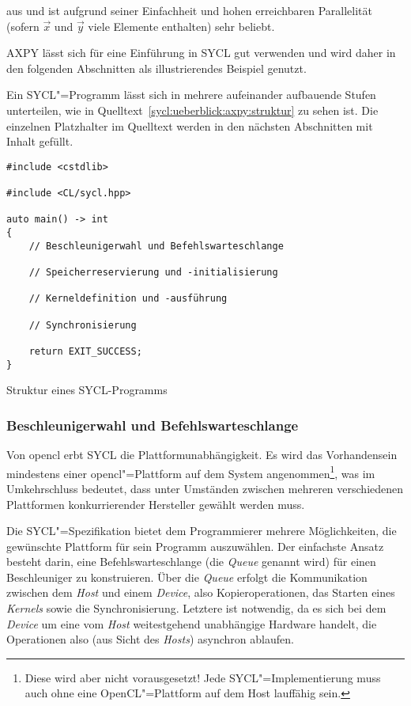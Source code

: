 aus und ist aufgrund seiner Einfachheit und hohen erreichbaren Parallelität
(sofern $\vec{x}$ und $\vec{y}$ viele Elemente enthalten) sehr beliebt.

AXPY lässt sich für eine Einführung in SYCL gut verwenden und wird daher in den
folgenden Abschnitten als illustrierendes Beispiel genutzt.

Ein SYCL"=Programm lässt sich in mehrere aufeinander aufbauende Stufen
unterteilen, wie in Quelltext~\ref{sycl:ueberblick:axpy:struktur} zu sehen ist.
Die einzelnen Platzhalter im Quelltext werden in den nächsten Abschnitten mit
Inhalt gefüllt.

\begin{code}
    \begin{verbatim}
#include <cstdlib>

#include <CL/sycl.hpp>

auto main() -> int
{
    // Beschleunigerwahl und Befehlswarteschlange

    // Speicherreservierung und -initialisierung

    // Kerneldefinition und -ausführung

    // Synchronisierung

    return EXIT_SUCCESS;
}
    \end{verbatim}
    \caption{Struktur eines SYCL-Programms}
    \label{sycl:ueberblick:axpy:struktur}
\end{code}

\subsubsection{Beschleunigerwahl und Befehlswarteschlange}
\label{sycl:ueberblick:axpy:queue}

Von \gls{opencl} erbt SYCL die Plattformunabhängigkeit. Es wird das
Vorhandensein mindestens einer \gls{opencl}"=Plattform auf dem System
angenommen\footnote{Diese wird aber nicht vorausgesetzt! Jede
SYCL"=Implementierung muss auch ohne eine OpenCL"=Plattform auf dem Host
lauffähig sein.}, was im Umkehrschluss bedeutet, dass unter Umständen zwischen
mehreren verschiedenen Plattformen konkurrierender Hersteller gewählt werden
muss. 

Die SYCL"=Spezifikation bietet dem Programmierer mehrere Möglichkeiten, die
gewünschte Plattform für sein Programm auszuwählen. Der einfachste Ansatz
besteht darin, eine Befehlswarteschlange (die \textit{Queue} genannt wird) für
einen Beschleuniger zu konstruieren. Über die \textit{Queue} erfolgt die
Kommunikation zwischen dem \textit{Host} und einem \textit{Device}, also
Kopieroperationen, das Starten eines \textit{Kernels} sowie die
Synchronisierung. Letztere ist notwendig, da es sich bei dem \textit{Device}
um eine vom \textit{Host} weitestgehend unabhängige Hardware handelt, die
Operationen also (aus Sicht des \textit{Hosts}) asynchron ablaufen.

